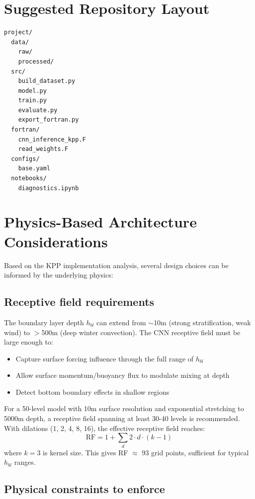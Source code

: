 \documentclass[11pt, a4paper]{article}
\begin{document}
\section{Suggested Repository Layout}

\begin{verbatim}
project/
  data/
    raw/
    processed/
  src/
    build_dataset.py
    model.py
    train.py
    evaluate.py
    export_fortran.py
  fortran/
    cnn_inference_kpp.F
    read_weights.F
  configs/
    base.yaml
  notebooks/
    diagnostics.ipynb
\end{verbatim}

\section{Physics-Based Architecture Considerations}

Based on the KPP implementation analysis, several design choices can be informed by the underlying physics:

\subsection{Receptive field requirements}

The boundary layer depth $h_{bl}$ can extend from $\sim$10m (strong stratification, weak wind) to $>$500m (deep winter convection). The CNN receptive field must be large enough to:
\begin{itemize}
    \item Capture surface forcing influence through the full range of $h_{bl}$
    \item Allow surface momentum/buoyancy flux to modulate mixing at depth
    \item Detect bottom boundary effects in shallow regions
\end{itemize}

For a 50-level model with 10m surface resolution and exponential stretching to 5000m depth, a receptive field spanning at least 30-40 levels is recommended. With dilations (1, 2, 4, 8, 16), the effective receptive field reaches:
\begin{equation}
\text{RF} = 1 + \sum_{d} 2 \cdot d \cdot (k-1)
\end{equation}
where $k=3$ is kernel size. This gives RF $\approx$ 93 grid points, sufficient for typical $h_{bl}$ ranges.

\subsection{Physical constraints to enforce}
\end{document}
